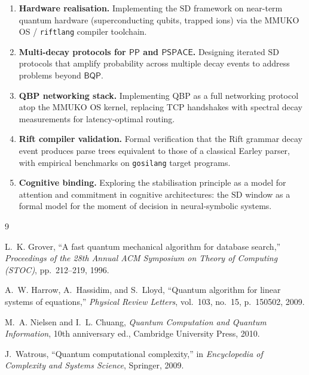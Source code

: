 \documentclass[12pt, a4paper]{article}
\theoremstyle{plain}
\theoremstyle{definition}
\theoremstyle{remark}
\newcommand{\pspace}{\ensuremath{\mathsf{PSPACE}}}
\newcommand{\bqp}{\ensuremath{\mathsf{BQP}}}
\newcommand{\pp}{\ensuremath{\mathsf{PP}}}
\newcommand{\SD}{\ensuremath{\mathrm{SD}}}   %
\begin{document}
\begin{enumerate}
  \item \textbf{Hardware realisation.}  Implementing the \SD{} framework on
        near-term quantum hardware (superconducting qubits, trapped ions) via
        the MMUKO OS / \texttt{riftlang} compiler toolchain.

  \item \textbf{Multi-decay protocols for \pp{} and \pspace.}  Designing
        iterated \SD{} protocols that amplify probability across multiple
        decay events to address problems beyond $\bqp$.

  \item \textbf{QBP networking stack.}  Implementing QBP as a full
        networking protocol atop the MMUKO OS kernel, replacing TCP
        handshakes with spectral decay measurements for latency-optimal
        routing.

  \item \textbf{Rift compiler validation.}  Formal verification that the
        Rift grammar decay event produces parse trees equivalent to those of
        a classical Earley parser, with empirical benchmarks on
        \texttt{gosilang} target programs.

  \item \textbf{Cognitive binding.}  Exploring the stabilisation principle
        as a model for attention and commitment in cognitive architectures:
        the \SD{} window as a formal model for the moment of decision in
        neural-symbolic systems.
\end{enumerate}

\begin{thebibliography}{9}

  L.~K. Grover,
  ``A fast quantum mechanical algorithm for database search,''
  \emph{Proceedings of the 28th Annual ACM Symposium on Theory of Computing
  (STOC)}, pp.\ 212--219, 1996.

  A.~W. Harrow, A.~Hassidim, and S.~Lloyd,
  ``Quantum algorithm for linear systems of equations,''
  \emph{Physical Review Letters}, vol.\ 103, no.\ 15, p.\ 150502, 2009.

  M.~A. Nielsen and I.~L. Chuang,
  \emph{Quantum Computation and Quantum Information},
  10th anniversary ed., Cambridge University Press, 2010.

  J.~Watrous,
  ``Quantum computational complexity,''
  in \emph{Encyclopedia of Complexity and Systems Science},
  Springer, 2009.

\end{thebibliography}
\end{document}

